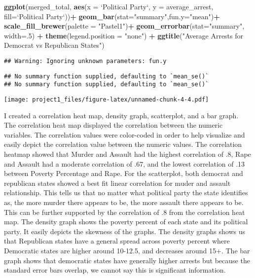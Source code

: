 \documentclass[]{article}
\newenvironment{Shaded}{\begin{snugshade}}{\end{snugshade}}
\newcommand{\DataTypeTok}[1]{\textcolor[rgb]{0.13,0.29,0.53}{#1}}
\newcommand{\DecValTok}[1]{\textcolor[rgb]{0.00,0.00,0.81}{#1}}
\newcommand{\KeywordTok}[1]{\textcolor[rgb]{0.13,0.29,0.53}{\textbf{#1}}}
\newcommand{\NormalTok}[1]{#1}
\newcommand{\OperatorTok}[1]{\textcolor[rgb]{0.81,0.36,0.00}{\textbf{#1}}}
\newcommand{\StringTok}[1]{\textcolor[rgb]{0.31,0.60,0.02}{#1}}
\begin{document}
\begin{Shaded}
\begin{Highlighting}[]
\KeywordTok{ggplot}\NormalTok{(merged_total, }\KeywordTok{aes}\NormalTok{(}\DataTypeTok{x =} \StringTok{`}\DataTypeTok{Political Party}\StringTok{`}\NormalTok{, }\DataTypeTok{y =}\NormalTok{ average_arrest, }\DataTypeTok{fill=}\StringTok{`}\DataTypeTok{Political Party}\StringTok{`}\NormalTok{))}\OperatorTok{+}
\KeywordTok{geom_bar}\NormalTok{(}\DataTypeTok{stat=}\StringTok{"summary"}\NormalTok{,}\DataTypeTok{fun.y=}\StringTok{"mean"}\NormalTok{)}\OperatorTok{+}\StringTok{ }\KeywordTok{scale_fill_brewer}\NormalTok{(}\DataTypeTok{palette =} \StringTok{"Pastel1"}\NormalTok{)}\OperatorTok{+}
\KeywordTok{geom_errorbar}\NormalTok{(}\DataTypeTok{stat=}\StringTok{"summary"}\NormalTok{, }\DataTypeTok{width=}\NormalTok{.}\DecValTok{5}\NormalTok{) }\OperatorTok{+}\StringTok{ }\KeywordTok{theme}\NormalTok{(}\DataTypeTok{legend.position =} \StringTok{"none"}\NormalTok{) }\OperatorTok{+}\StringTok{ }\KeywordTok{ggtitle}\NormalTok{(}\StringTok{"Average Arrests for Democrat vs Republican States"}\NormalTok{)}
\end{Highlighting}
\end{Shaded}

\begin{verbatim}
## Warning: Ignoring unknown parameters: fun.y
\end{verbatim}

\begin{verbatim}
## No summary function supplied, defaulting to `mean_se()`
## No summary function supplied, defaulting to `mean_se()`
\end{verbatim}

\texttt{[image: project1\_files/figure-latex/unnamed-chunk-4-4.pdf]}

I created a correlation heat map, density graph, scatterplot, and a bar
graph. The correlation heat map displayed the correlation between the
numeric variables. The correlation values were color-coded in order to
help visualize and easily depict the correlation value between the
numeric values. The correlation heatmap showed that Murder and Assault
had the highest correlation of .8, Rape and Assault had a moderate
correlation of .67, and the lowest correlation of .13 between Poverty
Percentage and Rape. For the scatterplot, both democrat and republican
states showed a best fit linear correlation for muder and assault
relationship. This tells us that no matter what political party the
state identifies as, the more murder there appears to be, the more
assault there appears to be. This can be further supported by the
correlation of .8 from the correlation heat map. The density graph shows
the poverty percent of each state and its political party. It easily
depicts the skewness of the graphs. The density graphs shows us that
Republican states have a general spread across poverty percent where
Democratic states are higher around 10-12.5, and decreases around 15+.
The bar graph shows that democratic states have generally higher arrests
but because the standard error bars overlap, we cannot say this is
significant information.
\end{document}

